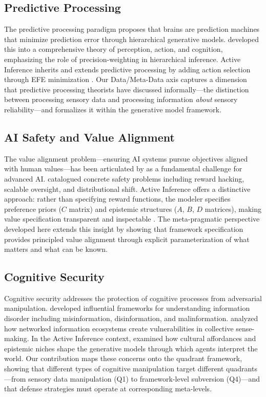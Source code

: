 \documentclass[
]{article}
\begin{document}
\subsection{Predictive Processing}\label{predictive-processing}

The predictive processing paradigm \cite{clark2013whatever} proposes
that brains are prediction machines that minimize prediction error
through hierarchical generative models. \cite{hohwy2013predictive}
developed this into a comprehensive theory of perception, action, and
cognition, emphasizing the role of precision-weighting in hierarchical
inference. Active Inference inherits and extends predictive processing
by adding action selection through EFE minimization
\cite{friston2015active}. Our Data/Meta-Data axis captures a dimension
that predictive processing theorists have discussed informally---the
distinction between processing sensory data and processing information
\emph{about} sensory reliability---and formalizes it within the
generative model framework.

\subsection{AI Safety and Value
Alignment}\label{ai-safety-and-value-alignment}

The value alignment problem---ensuring AI systems pursue objectives
aligned with human values---has been articulated by
\cite{russell2019human} as a fundamental challenge for advanced AI.
\cite{amodei2016concrete} catalogued concrete safety problems including
reward hacking, scalable oversight, and distributional shift. Active
Inference offers a distinctive approach: rather than specifying reward
functions, the modeler specifies preference priors (\(C\) matrix) and
epistemic structures (\(A\), \(B\), \(D\) matrices), making value
specification transparent and inspectable \cite{sajid2022active}. The
meta-pragmatic perspective developed here extends this insight by
showing that framework specification provides principled value alignment
through explicit parameterization of what matters and what can be known.

\subsection{Cognitive Security}\label{cognitive-security}

Cognitive security addresses the protection of cognitive processes from
adversarial manipulation. \cite{wardle2017information} developed
influential frameworks for understanding information disorder including
misinformation, disinformation, and malinformation.
\cite{benkler2018network} analyzed how networked information ecosystems
create vulnerabilities in collective sense-making. In the Active
Inference context, \cite{constant2019regimes} examined how cultural
affordances and epistemic niches shape the generative models through
which agents interpret the world. Our contribution maps these concerns
onto the quadrant framework, showing that different types of cognitive
manipulation target different quadrants---from sensory data manipulation
(Q1) to framework-level subversion (Q4)---and that defense strategies
must operate at corresponding meta-levels.
\end{document}
